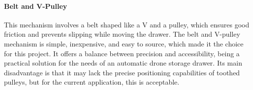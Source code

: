     \paragraph{Belt and V-Pulley} This mechanism involves a belt shaped like a V and a pulley, which ensures good friction and prevents slipping while moving the drawer. The belt and V-pulley mechanism is simple, inexpensive, and easy to source, which made it the choice for this project. It offers a balance between precision and accessibility, being a practical solution for the needs of an automatic drone storage drawer. Its main disadvantage is that it may lack the precise positioning capabilities of toothed pulleys, but for the current application, this is acceptable.

    

    
    
    


